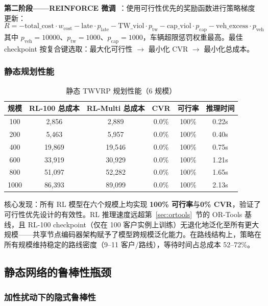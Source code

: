 \documentclass[12pt,a4paper,UTF8]{article}
\begin{document}
\textbf{第二阶段——REINFORCE 微调}~\cite{bello2016neural}：使用可行性优先的奖励函数进行策略梯度更新：
\[
R = -\text{total\_cost}\cdot w_{\text{cost}} - \text{late}\cdot p_{\text{late}} - \text{TW\_viol}\cdot p_{\text{tw}} - \text{cap\_viol}\cdot p_{\text{cap}} - \text{veh\_excess}\cdot p_{\text{veh}}
\]
其中 $p_{\text{veh}}=10000$、$p_{\text{tw}}=1000$、$p_{\text{cap}}=1000$，车辆超限惩罚权重最高。最佳 checkpoint 按复合键选取：最大化可行性 $\rightarrow$ 最小化 CVR $\rightarrow$ 最小化总成本。

\subsubsection{静态规划性能}

\begin{table}[htbp]
	\centering
	\caption{静态 TWVRP 规划性能（6 规模）}
	\label{tab:static_perf}
	\begin{tabular}{cccccc}
		\toprule
		规模 & RL-100 总成本 & RL-Multi 总成本 & CVR & 可行率 & 推理时间 \\
		\midrule
		100  & 2,856  & 2,889  & 0.0\% & 100\% & 0.22s \\
		200  & 5,463 & 5,957 & 0.0\% & 100\% & 0.40s \\
		400  & 19,869 & 19,546 & 0.0\% & 100\% & 0.75s \\
		600  & 33,919 & 30,929 & 0.0\% & 100\% & 1.21s \\
		800  & 51,097& 52,282& 0.0\% & 100\% & 1.65s \\
		1000 & 86,393& 89,099& 0.0\% & 100\% & 2.13s \\
		\bottomrule
	\end{tabular}
\end{table}

核心发现：所有 RL 模型在六个规模上均实现 \textbf{100\% 可行率}与\textbf{0\% CVR}，验证了可行性优先设计的有效性。RL 推理速度远超第~\ref{sec:ortools}~节的 OR-Tools 基线，且 RL-100 checkpoint（仅在 100 客户实例上训练）无退化地泛化至所有更大规模——共享节点编码器架构赋予了模型跨规模泛化能力。在路线结构上，策略在所有规模维持稳定的路线密度（9--11 客户/路线），等待时间占总成本 52--72\%。

\subsection{静态网络的鲁棒性瓶颈}

\subsubsection{加性扰动下的隐式鲁棒性}
\end{document}
